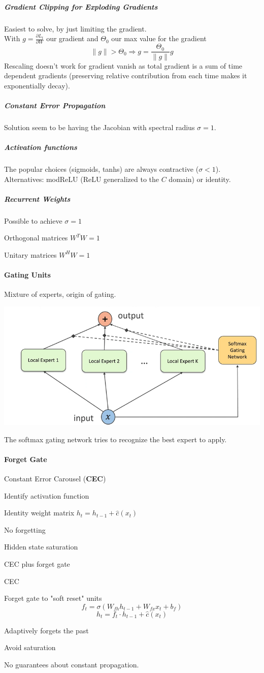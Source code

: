 \documentclass[10pt]{report}
\begin{document}
\subparagraph{Gradient Clipping for Exploding Gradients} Easiest to solve, by just limiting the gradient.\\
With $g=\frac{\partial L_t}{\partial W}$ our gradient and $\Theta_0$ our max value for the gradient
$$\|g\|>\Theta_0\Rightarrow g=\frac{\Theta_0}{\|g\|}g$$
Rescaling doesn't work for gradient vanish as total gradient is a sum of time dependent gradients (preserving relative contribution from each time makes it exponentially decay).
\subparagraph{Constant Error Propagation} Solution seem to be having the Jacobian with spectral radius $\sigma = 1$.
\subparagraph{Activation functions} The popular choices (sigmoids, tanhs) are always contractive ($\sigma < 1$). Alternatives: modReLU (ReLU generalized to the $C$ domain) or identity.
\subparagraph{Recurrent Weights} Possible to achieve $\sigma = 1$
\begin{list}{}{}
	\item Orthogonal matrices $W^TW = 1$
	\item Unitary matrices $W^H W = 1$
\end{list}
\paragraph{Gating Units} Mixture of experts, origin of gating.
\begin{center}
	\includegraphics[scale=0.5]{93.png}
\end{center}
The softmax gating network tries to recognize the best expert to apply.
\paragraph{Forget Gate} Constant Error Carousel (\textbf{CEC})\begin{list}{}{}
	\item Identify activation function
	\item Identity weight matrix $h_t = h_{t-1} +\hat{c}(x_t)$
	\item No forgetting
	\item Hidden state saturation
\end{list}
CEC plus forget gate
\begin{list}{}{}
	\item CEC
	\item Forget gate to "soft reset" units
	$$f_t = \sigma(W_{fh}h_{t-1} + W_{fx}x_t + b_f)$$
	$$h_t = f_t\cdot h_{t-1} + \hat{c}(x_t)$$
	\item Adaptively forgets the past
	\item Avoid saturation
	\item No guarantees about constant propagation.
\end{list}
\end{document}
